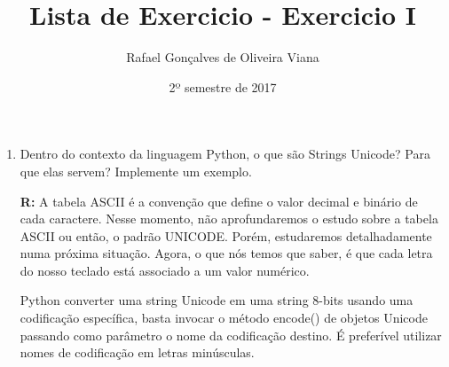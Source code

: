 \documentclass[12pt]{article}
\title{Lista de Exercicio  - Exercicio I }
\author{Rafael Gonçalves de  Oliveira Viana}
\date{2º semestre de 2017}
\begin{document}
\maketitle

\begin{enumerate}
\item
Dentro do contexto da linguagem Python, o que são Strings Unicode? Para que elas
servem? Implemente um exemplo.

\textbf{R: }
A tabela ASCII é a convenção que define o valor decimal e binário de cada caractere. Nesse momento, não aprofundaremos o estudo sobre a tabela ASCII ou então, o padrão UNICODE. Porém, estudaremos detalhadamente numa próxima situação. Agora, o que nós temos que saber, é que cada letra do nosso teclado está associado a um valor numérico.

Python converter uma string Unicode em uma string 8-bits usando uma codificação específica, basta invocar o método encode() de objetos Unicode passando como parâmetro o nome da codificação destino. É preferível utilizar nomes de codificação em letras minúsculas.

\inputminted{python}{Exemplo-4/StringUnicode.py}




\end{enumerate}
\end{document}
